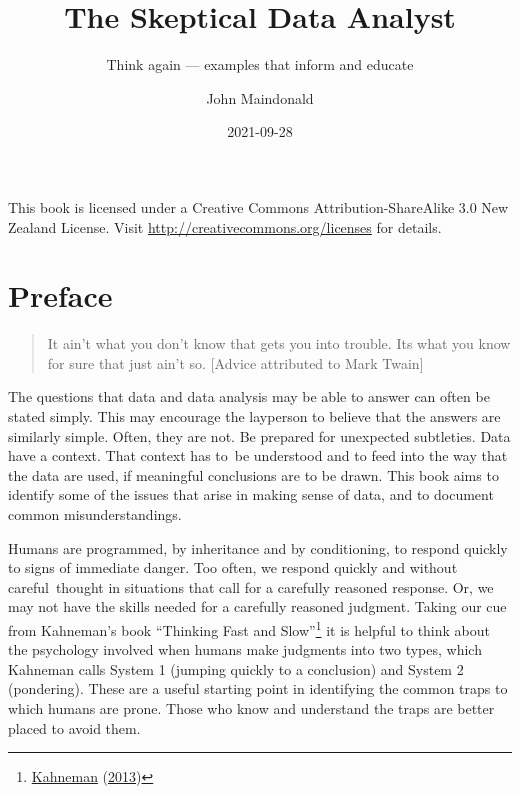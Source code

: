 \documentclass[
  10pt,
  b5paper]{book}
\title{The Skeptical Data Analyst}
\subtitle{Think again --- examples that inform and educate}
\author{John Maindonald}
\date{2021-09-28}
\begin{document}
\maketitle


This book is licensed under a Creative
Commons Attribution-ShareAlike 3.0 New Zealand License.
Visit \url{http://creativecommons.org/licenses} for details.


{
\hypersetup{linkcolor=}
\setcounter{tocdepth}{1}
\tableofcontents
}
\renewcommand{\bibname}{References}

\hypertarget{preface}{%
\chapter*{Preface}\label{preface}}

\begin{quote}
It ain't what you don't know that gets you into trouble.
Its what you know for sure that just ain't so.
{[}Advice attributed to Mark Twain{]}
\end{quote}

The questions that data and data analysis may be able to answer can
often be stated simply. This may encourage the layperson to believe
that the answers are similarly simple. Often, they are not. Be
prepared for unexpected subtleties. Data have a context. That
context has to~be understood and to feed into the way that the data
are used, if meaningful conclusions are to be drawn. This book
aims to identify some of the issues that arise in making sense of
data, and to document common misunderstandings.

Humans are programmed, by inheritance and by conditioning, to
respond quickly to signs of immediate danger. Too often, we
respond quickly and without careful~thought in situations that
call for a carefully reasoned response. Or, we may not have
the skills needed for a carefully reasoned judgment. Taking
our cue from Kahneman's book ``Thinking Fast and Slow''\footnote{\protect\hyperlink{ref-kahneman_2013}{Kahneman} (\protect\hyperlink{ref-kahneman_2013}{2013})}
it is helpful to think about the psychology involved when
humans make judgments into two types, which Kahneman calls System 1
(jumping quickly to a conclusion) and System 2 (pondering).
These are a useful starting point in identifying the common traps
to which humans are prone. Those who know and understand the traps
are better placed to avoid them.
\end{document}
